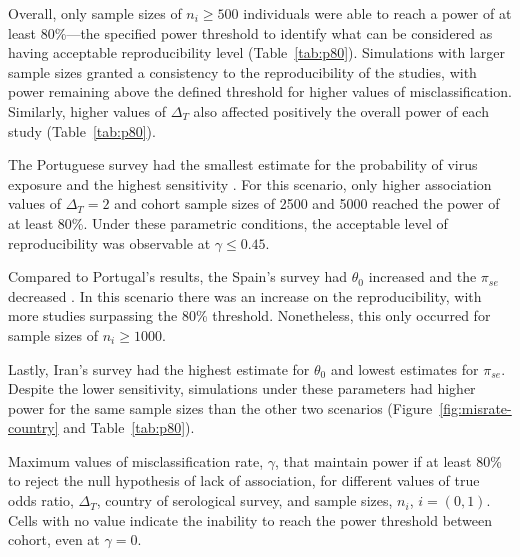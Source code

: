 Overall, only sample sizes of $n_i \geq 500$ individuals were able to reach a power of at least 80\%---the specified power threshold to identify what can be considered as having acceptable reproducibility level (Table~\ref{tab:p80}). Simulations with larger sample sizes granted a consistency to the reproducibility of the studies, with power remaining above the defined threshold for higher values of misclassification. Similarly, higher values of $\Delta_T$ also affected positively the overall power of each study (Table~\ref{tab:p80}).

The Portuguese survey had the smallest estimate for the probability of virus exposure and the highest sensitivity \citep{kislayaSeroprevalenceSARSCoV2Infection2021}. For this scenario, only higher association values of $\Delta_T = 2$ and cohort sample sizes of 2500 and 5000 reached the power of at least 80\%. Under these parametric conditions, the acceptable level of reproducibility was observable at $\gamma \leq 0.45$.

Compared to Portugal's results, the Spain's survey had $\theta_0$ increased and the $\pi_{se}$ decreased \citep{pollanPrevalenceSARSCoV2Spain2020}. In this scenario there was an increase on the reproducibility, with more studies surpassing the 80\% threshold. Nonetheless, this only occurred for sample sizes of $n_i \geq 1000$.

Lastly, Iran's survey \citep{khalagiPrevalenceCOVID19Iran2021} had the highest estimate for $\theta_0$ and lowest estimates for $\pi_{se}$. Despite the lower sensitivity, simulations under these parameters had higher power for the same sample sizes than the other two scenarios (Figure~\ref{fig:misrate-country} and Table~\ref{tab:p80}).

\begin{table}[h]
    \centering
    \caption[Maximum values of misclassification rate that maintain power if at least 80\% to reject the null hypothesis of lack of association, for different values of true odds ratio country of serological survey, and sample sizes]{Maximum values of misclassification rate, $\gamma$, that maintain power if at least 80\% to reject the null hypothesis of lack of association, for different values of true odds ratio, $\Delta_T$, country of serological survey, and sample sizes, $n_{i}$, $i=(0, 1)$. Cells with no value indicate the inability to reach the power threshold between cohort, even at $\gamma = 0$.}
    
    \label{tab:p80}
\end{table}

